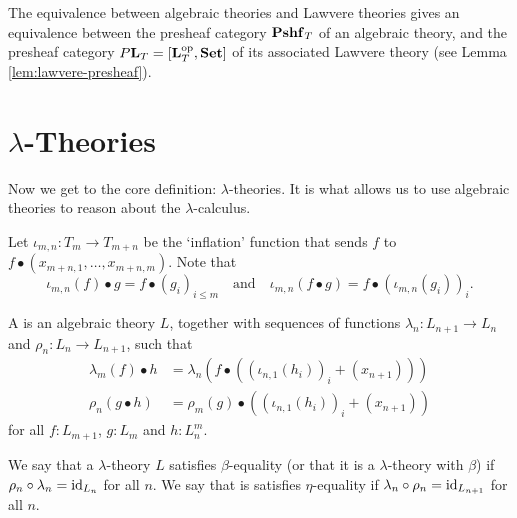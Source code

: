 The equivalence between algebraic theories and Lawvere theories gives an equivalence between the presheaf category $ \mathbf{Pshf}_{T} $ of an algebraic theory, and the presheaf category $ P \mathbf{L}_T = [\mathbf{L}_T^{\text{op}}, \mathbf{Set}] $ of its associated Lawvere theory (see Lemma \ref{lem:lawvere-presheaf}).

\section{\texorpdfstring{$ \lambda $-}{lambda-}Theories}\label{sec:lambda-theories}

Now we get to the core definition: $ \lambda $-theories. It is what allows us to use algebraic theories to reason about the $ \lambda $-calculus.

Let $ \iota_{m, n} : T_m \to T_{m + n} $ be the `inflation' function that sends $ f $ to $ f \bullet (x_{m + n, 1}, \dots, x_{m + n, m}) $. Note that
\[ \iota_{m, n}(f) \bullet g = f \bullet (g_i)_{i \leq m} \quad \text{and} \quad \iota_{m, n}(f \bullet g) = f \bullet (\iota_{m, n}(g_i))_i. \]

\begin{definition}
  A  is an algebraic theory $ L $, together with sequences of functions $ \lambda_n: L_{n + 1} \to L_n $ and $ \rho_n: L_n \to L_{n + 1} $, such that
  \begin{align*}
    \lambda_m(f) \bullet h &= \lambda_n(f \bullet ((\iota_{n, 1}(h_i))_i + (x_{n + 1})))\\
    \rho_n(g \bullet h) &= \rho_m(g) \bullet ((\iota_{n, 1}(h_i))_i + (x_{n + 1}))
  \end{align*}
  for all $ f: L_{m + 1} $, $ g: L_m $ and $ h: L_n^m $.
\end{definition}

\begin{definition}\label{def:beta-equality}
  We say that a $ \lambda $-theory $ L $ satisfies $ \beta $-equality (or that it is a $ \lambda $-theory with $ \beta $) if $ \rho_n \circ \lambda_n = \text{id}_{L_n} $ for all $ n $. We say that is satisfies $ \eta $-equality if $ \lambda_n \circ \rho_n = \text{id}_{L_{n + 1}} $ for all $ n $.
\end{definition}

